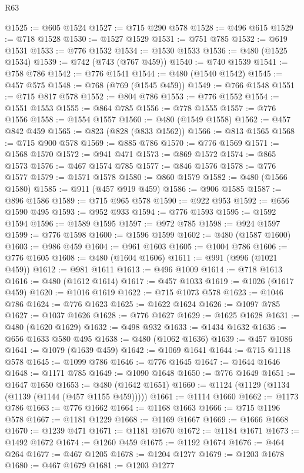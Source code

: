 \begin{lexlean}{R63}
\begin{coremodule}
@1525 := @605 @1524
@1527 := @715 @290 @578
@1528 := @496 @615
@1529 := @718 @1528
@1530 := @1527 @1529
@1531 := @751 @785
@1532 := @619 @1531
@1533 := @776 @1532
@1534 := @1530 @1533
@1536 := @480 (@1525 @1534)
@1539 := @742 (@743 (@767 @459))
@1540 := @740 @1539
@1541 := @758 @786
@1542 := @776 @1541
@1544 := @480 (@1540 @1542)
@1545 := @457 @575
@1548 := @768 (@769 (@1545 @459))
@1549 := @766 @1548
@1551 := @715 @817 @578
@1552 := @804 @786
@1553 := @776 @1552
@1554 := @1551 @1553
@1555 := @864 @785
@1556 := @778 @1555
@1557 := @776 @1556
@1558 := @1554 @1557
@1560 := @480 (@1549 @1558)
@1562 := @457 @842 @459
@1565 := @823 (@828 (@833 @1562))
@1566 := @813 @1565
@1568 := @715 @900 @578
@1569 := @885 @786
@1570 := @776 @1569
@1571 := @1568 @1570
@1572 := @941 @471
@1573 := @869 @1572
@1574 := @865 @1573
@1576 := @467 @1574 @785
@1577 := @846 @1576
@1578 := @776 @1577
@1579 := @1571 @1578
@1580 := @860 @1579
@1582 := @480 (@1566 @1580)
@1585 := @911 (@457 @919 @459)
@1586 := @906 @1585
@1587 := @896 @1586
@1589 := @715 @965 @578
@1590 := @922 @953
@1592 := @656 @1590 @495
@1593 := @952 @933
@1594 := @776 @1593
@1595 := @1592 @1594
@1596 := @1589 @1595
@1597 := @972 @785
@1598 := @924 @1597
@1599 := @776 @1598
@1600 := @1596 @1599
@1602 := @480 (@1587 @1600)
@1603 := @986 @459
@1604 := @961 @1603
@1605 := @1004 @786
@1606 := @776 @1605
@1608 := @480 (@1604 @1606)
@1611 := @991 (@996 (@1021 @459))
@1612 := @981 @1611
@1613 := @496 @1009
@1614 := @718 @1613
@1616 := @480 (@1612 @1614)
@1617 := @457 @1033
@1619 := @1026 (@1617 @459)
@1620 := @1016 @1619
@1622 := @715 @1073 @578
@1623 := @1046 @786
@1624 := @776 @1623
@1625 := @1622 @1624
@1626 := @1097 @785
@1627 := @1037 @1626
@1628 := @776 @1627
@1629 := @1625 @1628
@1631 := @480 (@1620 @1629)
@1632 := @498 @932
@1633 := @1434 @1632
@1636 := @656 @1633 @580 @495
@1638 := @480 (@1062 @1636)
@1639 := @457 @1086
@1641 := @1079 (@1639 @459)
@1642 := @1069 @1641
@1644 := @715 @1118 @578
@1645 := @1099 @786
@1646 := @776 @1645
@1647 := @1644 @1646
@1648 := @1171 @785
@1649 := @1090 @1648
@1650 := @776 @1649
@1651 := @1647 @1650
@1653 := @480 (@1642 @1651)
@1660 := @1124 (@1129 (@1134 (@1139 (@1144 (@457 @1155 @459)))))
@1661 := @1114 @1660
@1662 := @1173 @786
@1663 := @776 @1662
@1664 := @1168 @1663
@1666 := @715 @1196 @578
@1667 := @1181 @1229
@1668 := @1169 @1667
@1669 := @1666 @1668
@1670 := @1239 @471
@1671 := @1181 @1670
@1672 := @1184 @1671
@1673 := @1492 @1672
@1674 := @1260 @459
@1675 := @1192 @1674
@1676 := @464 @264
@1677 := @467 @1205
@1678 := @1204 @1277
@1679 := @1203 @1678
@1680 := @467 @1679
@1681 := @1203 @1277

\end{coremodule}
\end{lexlean}
